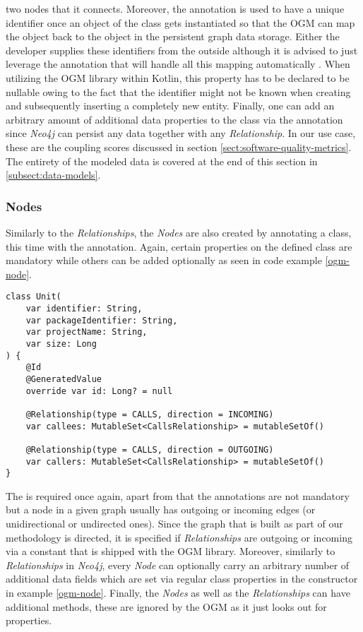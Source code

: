 \documentclass[12pt,a4paper]{report}
\begin{document}
two nodes that it connects.
Moreover, the  annotation is used to have a unique identifier
once an object of the class gets instantiated so that the OGM can map
the object back to the object in the persistent graph data storage.
Either the developer supplies these identifiers from the outside although
it is advised to just leverage the  annotation that
will handle all this mapping automatically \cite{neo4j-ogm}.
When utilizing the OGM library within Kotlin, this property has to be
declared to be nullable owing to the fact that the identifier might not
be known when creating and subsequently inserting a completely new entity.
Finally, one can add an arbitrary amount of additional data properties
to the class via the  annotation since \textit{Neo4j} can persist
any data together with any \textit{Relationship}. In our use case,
these are the coupling scores discussed in section \ref{sect:software-quality-metrics}.
The entirety of the modeled data is covered at the end of this section in
\ref{subsect:data-models}.


\subsubsection{Nodes}
Similarly to the \textit{Relationships}, the \textit{Nodes} are also
created by annotating a class, this time with the 
annotation. Again, certain properties on the defined class are mandatory
while others can be added optionally as seen in code example \ref{ogm-node}.
\smaller
\begin{lstlisting}[caption=Node OGM class, label=ogm-node, breaklines=true]
class Unit(
    var identifier: String,
    var packageIdentifier: String,
    var projectName: String,
    var size: Long
) {
    @Id
    @GeneratedValue
    override var id: Long? = null

    @Relationship(type = CALLS, direction = INCOMING)
    var callees: MutableSet<CallsRelationship> = mutableSetOf()

    @Relationship(type = CALLS, direction = OUTGOING)
    var callers: MutableSet<CallsRelationship> = mutableSetOf()
}
\end{lstlisting}
\normalsize
The  is required once again, apart from that the 
annotations are not mandatory but a node in a given graph usually has outgoing
or incoming edges (or unidirectional or undirected ones).
Since the graph that is built as part of our methodology is directed,
it is specified if \textit{Relationships} are outgoing or incoming via
a constant that is shipped with the OGM library.
Moreover, similarly to \textit{Relationships} in \textit{Neo4j}, every \textit{Node}
can optionally carry an arbitrary number of additional data fields which are set
via regular class properties in the constructor in example \ref{ogm-node}.
Finally, the \textit{Nodes} as well as the \textit{Relationships} can have additional
methods, these are ignored by the OGM as it just looks out for properties.
\end{document}
